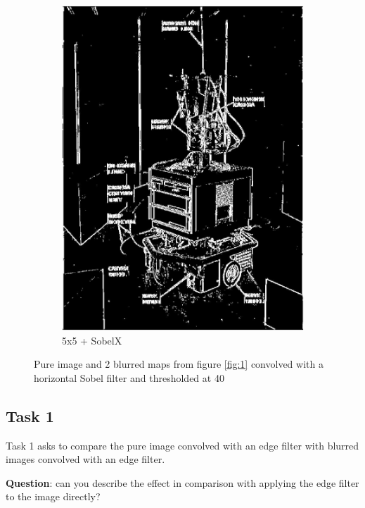 \documentclass[lettersize,journal]{IEEEtran}
\begin{document}
\begin{figure}[h]
\begin{subfigure}[h]{0.155\textwidth}
        \includegraphics[width=\linewidth]{gaussian_5x5_sobelX_map}
        \caption{5x5 + SobelX}  
    \end{subfigure}
    \caption{Pure image and 2 blurred maps from figure \autoref{fig:1} convolved with a horizontal Sobel filter and thresholded at 40}
    \label{fig:2}
\end{figure}

\subsection{Task 1}\label{subsection:1:2}

\noindent Task 1 asks to compare the pure image convolved with an edge filter with blurred images convolved with an edge filter.

\hfill

\noindent\textbf{Question}: can you describe the effect in comparison with applying the edge filter to the image directly?
\end{document}
